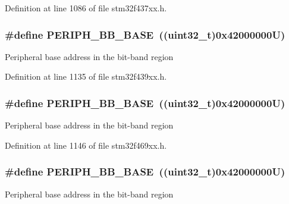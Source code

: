 Definition at line 1086 of file stm32f437xx.\+h.

\subsubsection[{\texorpdfstring{P\+E\+R\+I\+P\+H\+\_\+\+B\+B\+\_\+\+B\+A\+SE}{PERIPH_BB_BASE}}]{\setlength{\rightskip}{0pt plus 5cm}\#define P\+E\+R\+I\+P\+H\+\_\+\+B\+B\+\_\+\+B\+A\+SE~((uint32\+\_\+t)0x42000000\+U)}\hypertarget{group___peripheral__memory__map_gaed7efc100877000845c236ccdc9e144a}{}\label{group___peripheral__memory__map_gaed7efc100877000845c236ccdc9e144a}
Peripheral base address in the bit-\/band region 

Definition at line 1135 of file stm32f439xx.\+h.

\subsubsection[{\texorpdfstring{P\+E\+R\+I\+P\+H\+\_\+\+B\+B\+\_\+\+B\+A\+SE}{PERIPH_BB_BASE}}]{\setlength{\rightskip}{0pt plus 5cm}\#define P\+E\+R\+I\+P\+H\+\_\+\+B\+B\+\_\+\+B\+A\+SE~((uint32\+\_\+t)0x42000000\+U)}\hypertarget{group___peripheral__memory__map_gaed7efc100877000845c236ccdc9e144a}{}\label{group___peripheral__memory__map_gaed7efc100877000845c236ccdc9e144a}
Peripheral base address in the bit-\/band region 

Definition at line 1146 of file stm32f469xx.\+h.

\subsubsection[{\texorpdfstring{P\+E\+R\+I\+P\+H\+\_\+\+B\+B\+\_\+\+B\+A\+SE}{PERIPH_BB_BASE}}]{\setlength{\rightskip}{0pt plus 5cm}\#define P\+E\+R\+I\+P\+H\+\_\+\+B\+B\+\_\+\+B\+A\+SE~((uint32\+\_\+t)0x42000000\+U)}\hypertarget{group___peripheral__memory__map_gaed7efc100877000845c236ccdc9e144a}{}\label{group___peripheral__memory__map_gaed7efc100877000845c236ccdc9e144a}
Peripheral base address in the bit-\/band region 

